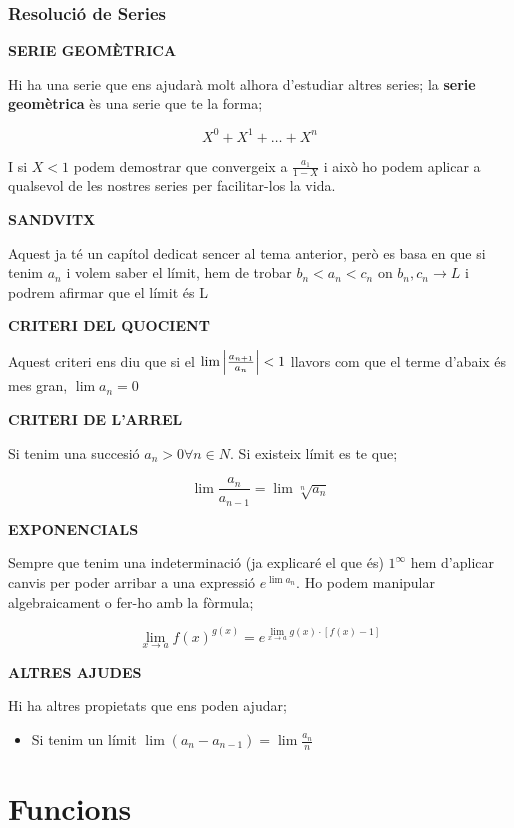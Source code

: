 \documentclass[12pt]{article}
\begin{document}
    \subsubsection{Resolució de Series}

    \textbf{SERIE GEOMÈTRICA}

    Hi ha una serie que ens ajudarà molt alhora d'estudiar altres series; la \textbf{serie geomètrica} ès una serie que te la forma;

    \[X^0 + X^1 + \dots + X^n\]

    I si $X < 1$ podem demostrar que convergeix a $\frac{a_1}{1-X}$ i això ho podem aplicar a qualsevol de les nostres series per facilitar-los la vida.

    \noindent\textbf{SANDVITX}

    Aquest ja té un capítol dedicat sencer al tema anterior, però es basa en que si tenim $a_n$ i volem saber el límit, hem de trobar $b_n < a_n < c_n$ on $b_n, c_n \rightarrow L$ i podrem afirmar que el límit és L

    \noindent\textbf{CRITERI DEL QUOCIENT}

    Aquest criteri ens diu que si el $\lim \abs{\frac{a_{n+1}}{a_n} } < 1$ llavors com que el terme d'abaix és mes gran, $\lim a_n = 0$

    \noindent\textbf{CRITERI DE L'ARREL}

    Si tenim una succesió $a_n > 0 \forall n\in N$. Si existeix límit es te que;
    
    \[\lim \frac{a_n}{a_{n-1}} = \lim \sqrt[n]{a_n}\]

    \noindent\textbf{EXPONENCIALS}

    Sempre que tenim una indeterminació (ja explicaré el que és) $1^{\infty}$ hem d'aplicar canvis per poder arribar a una expressió $e^{\lim a_n}$. Ho podem manipular algebraicament o fer-ho amb la fòrmula;

    \[\lim_{x \to a} f(x)^{g(x)} = e^{\lim_{x \to a} g(x) \cdot [f(x) - 1]}\]

    \noindent\textbf{ALTRES AJUDES}

    Hi ha altres propietats que ens poden ajudar;

    \begin{itemize}
        \item Si tenim un límit $\lim(a_n - a_{n-1}) = \lim \frac{a_n}{n}$
    \end{itemize}

\section{Funcions}
\end{document}
